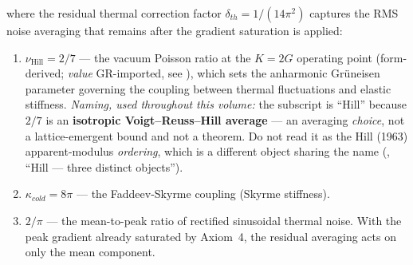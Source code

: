 where the residual thermal correction factor $\delta_{th} = 1/(14\pi^2)$ captures the RMS noise averaging that remains after the gradient saturation is applied:
\begin{enumerate}
    \item $\nu_{\text{Hill}} = 2/7$ --- the vacuum Poisson ratio at the $K = 2G$ operating point
    (form-derived; \emph{value} GR-imported, see
    ), which sets the anharmonic
    Gr{\"u}neisen parameter governing the coupling between thermal fluctuations and elastic
    stiffness. \emph{Naming, used throughout this volume:} the subscript is ``Hill'' because $2/7$
    is an \textbf{isotropic Voigt--Reuss--Hill average} --- an averaging \emph{choice}, not a
    lattice-emergent bound and not a theorem. Do not read it as the Hill (1963) apparent-modulus
    \emph{ordering}, which is a different object sharing the name
    (, ``Hill --- three distinct objects'').
    \item $\kappa_{cold} = 8\pi$ --- the Faddeev-Skyrme coupling (Skyrme stiffness).
    \item $2/\pi$ --- the mean-to-peak ratio of rectified sinusoidal thermal noise. With the peak gradient already saturated by Axiom~4, the residual averaging acts on only the mean component.
\end{enumerate}

